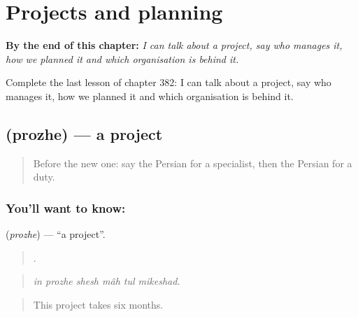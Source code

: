 
\chapter{Projects and planning}
\label{ch:fa-projects-and-planning}

\begin{chapteropening}
\textbf{By the end of this chapter:} \emph{I can talk about a project, say who manages it, how we planned it and which organisation is behind it.}

Complete the last lesson of chapter 382: I can talk about a project, say who manages it, how we planned it and which organisation is behind it.
\end{chapteropening}

\section[\texorpdfstring{\fa{پروژه} (prozhe)}{پروژه (prozhe)}]{ (prozhe) — a project}

\label{lesson:FA-C382-prozhe}



\begin{quote}
Before the new one: say the Persian for a specialist, then the Persian for a duty.
\end{quote}

\subsection*{You'll want to know: }
\textbf{} (\emph{prozhe}) — \textquotedblleft{}a project\textquotedblright{}.

\begin{quote}
     .
\end{quote}

\begin{quote}
\emph{in prozhe shesh mâh tul mikeshad.}
\end{quote}

\begin{quote}
This project takes six months.
\end{quote}

